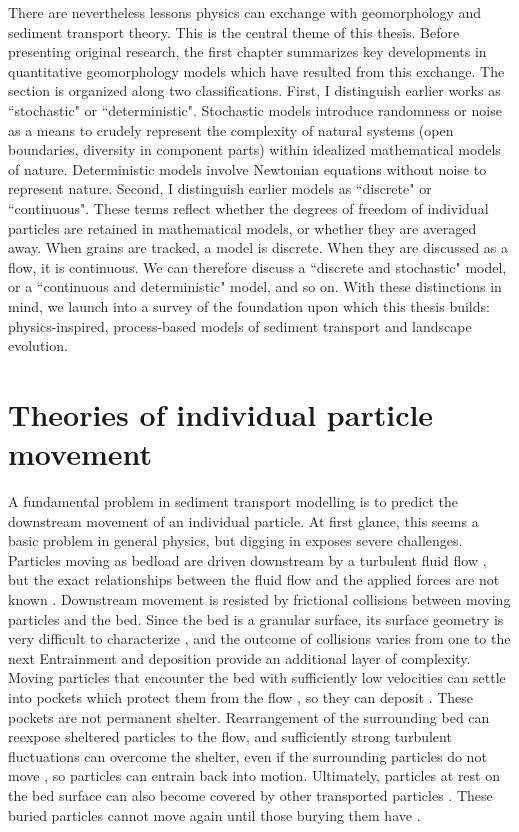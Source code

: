 There are nevertheless lessons physics can exchange with geomorphology and sediment transport theory. This is the central theme of this thesis. Before presenting original research, the first chapter summarizes key developments in quantitative geomorphology models which have resulted from this exchange. The section is organized along two classifications. First, I distinguish earlier works as ``stochastic" or ``deterministic". Stochastic models introduce randomness or noise as a means to crudely represent the complexity of natural systems (open boundaries, diversity in component parts) within idealized mathematical models of nature. Deterministic models involve Newtonian equations without noise to represent nature. Second, I distinguish earlier models as ``discrete" or ``continuous". These terms reflect whether the degrees of freedom of individual particles are retained in mathematical models, or whether they are averaged away. When grains are tracked, a model is discrete. When they are discussed as a flow, it is continuous. We can therefore discuss a ``discrete and stochastic" model, or a ``continuous and deterministic" model, and so on.
With these distinctions in mind, we launch into a survey of the foundation upon which this thesis builds: physics-inspired, process-based models of sediment transport and landscape evolution.

\section{Theories of individual particle movement}

A fundamental problem in sediment transport modelling is to predict the downstream movement of an individual particle.
At first glance, this seems a basic problem in general physics, but digging in exposes severe challenges.
Particles moving as bedload are driven downstream by a turbulent fluid flow \citep{}, but the exact relationships between the fluid flow and the applied forces are not known \citep{Furbish1997}.
Downstream movement is resisted by frictional collisions between moving particles and the bed.
Since the bed is a granular surface, its surface geometry is very difficult to characterize \citep{Gordon1972}, and the outcome of collisions varies from one to the next \citep{Sekine1992}
Entrainment and deposition provide an additional layer of complexity.
Moving particles that encounter the bed with sufficiently low velocities can settle into pockets which protect them from the flow \citep{Miller1966}, so they can deposit \citep{Charru2004}.
These pockets are not permanent shelter.
Rearrangement of the surrounding bed can reexpose sheltered particles to the flow, and sufficiently strong turbulent fluctuations can overcome the shelter, even if the surrounding particles do not move \citep{Valyrakis2012,Celik2014}, so particles can entrain back into motion.
Ultimately, particles at rest on the bed surface can also become covered by other transported particles \citep{Yang1972}. These buried particles cannot move again until those burying them have \citep{Nakagawa1981}.

